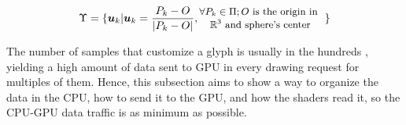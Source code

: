 \documentclass[twoside,twocolumn,10pt]{article}
\begin{document}
\begin{equation}
\label{eq::u_vector_set}
\Upsilon = \{\bm{u}_k | \bm{u}_k = \frac{P_k - O}{|P_k - O|}, 
\begin{tabular}{@{}c@{}}
\small{$\forall P_k \in \Pi; O$ is the origin in } \\
\small{$\mathbb{R}^3$ and sphere's center}



\end{tabular}
\text{ }\}
\end{equation}


The number of samples that customize a glyph is usually in the hundreds \cite{TuchQBall2004, yeh2010}, yielding a high amount of data sent to GPU in every drawing request for multiples of them. Hence, this subsection aims to show a way to organize the data in the CPU, how to send it to the GPU, and how the shaders read it, so the CPU-GPU data traffic is as minimum as possible. %





\end{document}
